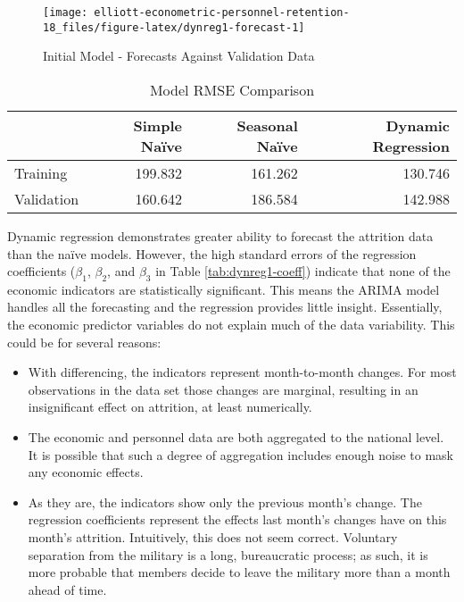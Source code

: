 \documentclass[12pt,letterpaper,toc=flat,oneside]{report}
\theoremstyle{definition}
\theoremstyle{definition}
\theoremstyle{definition}
\theoremstyle{remark}
\begin{document}
\begin{figure}[H]

{\centering \texttt{[image: elliott-econometric-personnel-retention-18\_files/figure-latex/dynreg1-forecast-1]} 

}

\caption{Initial Model - Forecasts Against Validation Data}\label{fig:dynreg1-forecast}
\end{figure}

\begin{table}[!h]

\caption{\label{tab:model-compare-1}Model RMSE Comparison}
\centering
\begin{tabular}[t]{lrrr}
\toprule
\bfseries{ } & \bfseries{Simple Naïve} & \bfseries{Seasonal Naïve} & \bfseries{Dynamic Regression}\\
\midrule
Training & 199.832 & 161.262 & 130.746\\
Validation & 160.642 & 186.584 & 142.988\\
\bottomrule
\end{tabular}
\end{table}

Dynamic regression demonstrates greater ability to forecast the
attrition data than the naïve models. However, the high standard errors
of the regression coefficients (\(\beta_1\), \(\beta_2\), and
\(\beta_3\) in Table \ref{tab:dynreg1-coeff}) indicate that none of the
economic indicators are statistically significant. This means the ARIMA
model handles all the forecasting and the regression provides little
insight. Essentially, the economic predictor variables do not explain
much of the data variability. This could be for several reasons:

\begin{itemize}
\item
  With differencing, the indicators represent month-to-month changes.
  For most observations in the data set those changes are marginal,
  resulting in an insignificant effect on attrition, at least
  numerically.
\item
  The economic and personnel data are both aggregated to the national
  level. It is possible that such a degree of aggregation includes
  enough noise to mask any economic effects.
\item
  As they are, the indicators show only the previous month's change. The
  regression coefficients represent the effects last month's changes
  have on this month's attrition. Intuitively, this does not seem
  correct. Voluntary separation from the military is a long,
  bureaucratic process; as such, it is more probable that members decide
  to leave the military more than a month ahead of time.
\end{itemize}
\end{document}
